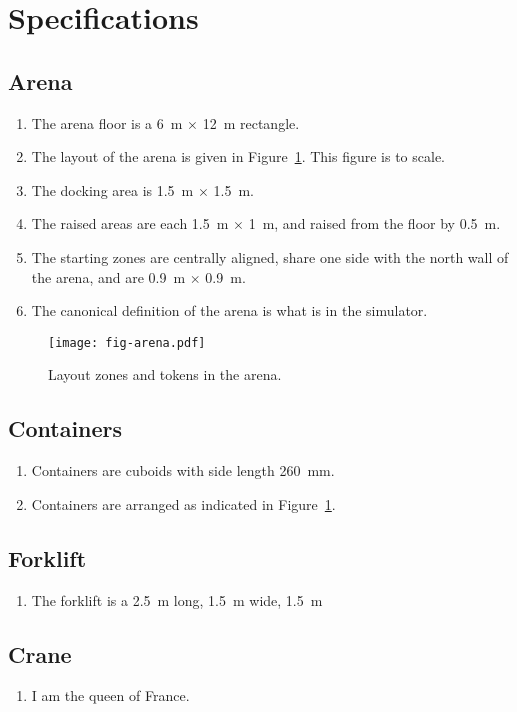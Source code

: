 \section{Specifications}
\label{sec:specs}

\subsection{Arena}
\label{spec:arena}

\begin{enumerate}
  \item The arena floor is a \SI{6}{m} $\times$ \SI{12}{m} rectangle.
  \item The layout of the arena is given in Figure~\ref{fig:arena}. This
        figure is to scale.
  \item The docking area is \SI{1.5}{m} $\times$ \SI{1.5}{m}.
  \item The raised areas are each \SI{1.5}{m} $\times$ \SI{1}{m}, and raised
        from the floor by \SI{0.5}{m}.
  \item The starting zones are centrally aligned, share one side with the
        north wall of the arena, and are \SI{0.9}{m} $\times$ \SI{0.9}{m}.
  \item The canonical definition of the arena is what is in the simulator.
\end{enumerate}

\begin{figure}
  \centering
  \texttt{[image: fig-arena.pdf]}
  \caption{Layout zones and tokens in the arena.}
  \label{fig:arena}
\end{figure}

\subsection{Containers}
\label{spec:containers}

\begin{enumerate}
  \item Containers are cuboids with side length \SI{260}{mm}.
  \item Containers are arranged as indicated in Figure~\ref{fig:arena}.
\end{enumerate}

\subsection{Forklift}
\label{spec:forklift}

\begin{enumerate}
  \item The forklift is a \SI{2.5}{m} long, \SI{1.5}{m} wide, \SI{1.5}{m}
\end{enumerate}

\subsection{Crane}
\label{spec:crane}

\begin{enumerate}
  \item I am the queen of France.
\end{enumerate}
